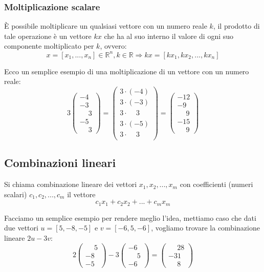 \documentclass[../main.tex]{subfiles}
\begin{document}
\subsubsection{Moltiplicazione scalare}
È possibile moltiplicare un qualsiasi vettore con un numero reale $k$, il prodotto di tale operazione è un vettore $kx$ che ha al suo interno il valore di ogni suo componente moltiplicato per $k$, ovvero:
$$
    x=[x_1,...,x_n]\in \mathbb{R}^n, k\in \mathbb{R} \Rightarrow 
    kx=[kx_1,kx_2,...,kx_n]
$$

Ecco un semplice esempio di una moltiplicazione di un vettore con un numero reale:
$$
    3 \begin{pmatrix}
        -4 \\
        -3 \\
        \phantom{-}3 \\
        -5 \\
        \phantom{-}3
    \end{pmatrix} =
    \begin{pmatrix}
        3 \cdot (-4) \\
        3 \cdot (-3) \\
        3 \cdot \phantom{(-}3 \phantom{)}\\
        3 \cdot (-5) \\
        3 \cdot \phantom{(-}3 \phantom{)}
    \end{pmatrix} =
    \begin{pmatrix}
        -12 \\
        -9 \\
        \phantom{-}9 \\
        -15 \\
        \phantom{-}9
    \end{pmatrix}
$$    

\subsection{Combinazioni lineari}
Si chiama combinazione lineare dei vettori $x_1,x_2,...,x_m$ con coefficienti (numeri scalari) $c_1,c_2,...,c_m$ il vettore
$$
    c_1x_1+c_2x_2+...+c_mx_m
$$

Facciamo un semplice esempio per rendere meglio l'idea, mettiamo caso che dati due vettori $u=[5, -8, -5]$ e $v=[-6, 5, -6]$, vogliamo trovare la combinazione lineare $2u-3v$:
$$
    2 \begin{pmatrix}
        \phantom{-}5 \\
        -8 \\
        -5
    \end{pmatrix} -3
    \begin{pmatrix}
        -6 \\
        \phantom{-}5 \\
        -6
    \end{pmatrix} = 
    \begin{pmatrix}
        \phantom{-}28 \\
        -31 \\
        \phantom{-}8
    \end{pmatrix}
$$
\end{document}
